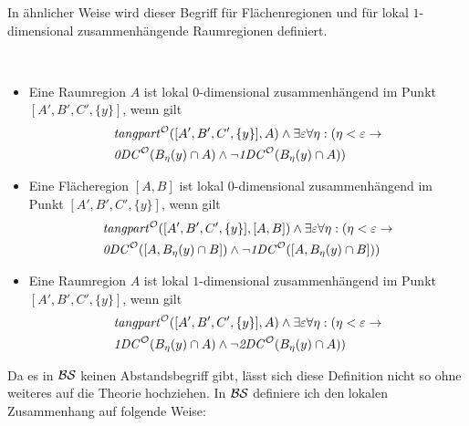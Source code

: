    In ähnlicher Weise wird dieser Begriff für Flächenregionen und für lokal $1$-dimensional zusammenhängende Raumregionen definiert.

    \begin{dfn}\ \vspace{0pt}

        \begin{itemize}
            \item Eine Raumregion $A$ ist lokal $0$-dimensional zusammenhängend im Punkt $[A', B', C', \{y\}]$, wenn gilt
            \begin{align*}
                &\mathit{tangpart}^\mathcal{O}([A', B', C', \{y\}],A) \land \exists \varepsilon \forall \eta: (\eta < \varepsilon \to 
                \\
                &\mathit{0DC}^\mathcal{O}(B_{\eta}(y) \cap A) \land \neg \mathit{1DC}^\mathcal{O}(B_{\eta}(y) \cap A))
            \end{align*}
            \item Eine Flächeregion $[A,B]$ ist lokal $0$-dimensional zusammenhängend im Punkt $[A', B', C', \{y\}]$, wenn gilt
            \begin{align*}
                &\mathit{tangpart}^\mathcal{O}([A', B', C', \{y\}],[A,B]) \land \exists \varepsilon \forall \eta:
                (\eta < \varepsilon \to
                \\
                &\mathit{0DC}^\mathcal{O}([A,B_{\eta}(y) \cap B]) \land \neg \mathit{1DC}^\mathcal{O}([A,B_{\eta}(y) \cap B]))
            \end{align*}
            \item Eine Raumregion $A$ ist lokal $1$-dimensional zusammenhängend im Punkt $[A', B', C', \{y\}]$, wenn gilt
            \begin{align*}
                &\mathit{tangpart}^\mathcal{O}([A', B', C', \{y\}],A) \land \exists \varepsilon \forall \eta: (\eta < \varepsilon \to 
                \\
                &\mathit{1DC}^\mathcal{O}(B_{\eta}(y) \cap A) \land \neg \mathit{2DC}^\mathcal{O}(B_{\eta}(y) \cap A))
            \end{align*}
        \end{itemize}
        
    \end{dfn}
%     
%     


    Da es in $\mathcal{BS}$ keinen Abstandsbegriff gibt, lässt sich diese Definition nicht so ohne weiteres auf die Theorie hochziehen. 
    In $\mathcal{BS}$ definiere ich den lokalen Zusammenhang auf folgende Weise:

